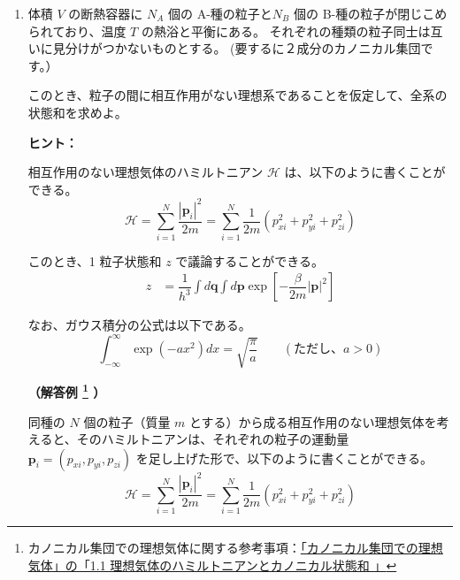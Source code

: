 \documentclass[uplatex,dvipdfmx,a4paper,11pt]{jsarticle}
\begin{document}
\begin{enumerate}
\setlength{\parskip}{0cm} %
\setlength{\itemsep}{0.3cm} %

\item
体積 $V$ の断熱容器に $N_A$ 個の A-種の粒子と$N_B$ 個の B-種の粒子が閉じこめられており、温度 $T$ の熱浴と平衡にある。
それぞれの種類の粒子同士は互いに見分けがつかないものとする。
(要するに２成分のカノニカル集団です。）

このとき、粒子の間に相互作用がない理想系であることを仮定して、全系の状態和を求めよ。

\begin{itembox}[l]{{\bf ヒント：}}

相互作用のない理想気体のハミルトニアン $\mathcal{H}$ は、以下のように書くことができる。
\begin{equation*}
	\mathcal{H} = \sum^N_{i=1}\dfrac{|\bm{p}_i|^2}{2m} = \sum^N_{i=1} \dfrac{1}{2m}(p_{xi}^2 + p_{yi}^2 +p_{zi}^2)
        \label{eq:H_ideal}
\end{equation*}

このとき、1 粒子状態和 $z$ で議論することができる。
\begin{align*}
	z 	&= \dfrac{1}{h^{3}} \int d\bm{q} \int d\bm{p} \exp \left[ -\dfrac{\beta}{2m} |\bm{p}|^2 \right] 
\end{align*}

なお、ガウス積分の公式は以下である。
\begin{equation*}
	\int_{-\infty}^{\infty} \exp(-ax^2)dx = \sqrt{\dfrac{\pi}{a}} \qquad (\text{ただし、$a > 0$}) 
        \label{eq:gauss_sekibunn}
\end{equation*}

\end{itembox}

{\bf （解答例
\footnote{
カノニカル集団での理想気体に関する参考事項：\href{http://kisokouza.island.ac/documents/Cannonical_Ideal_Gas.pdf}{「カノニカル集団での理想気体」の「1.1 理想気体のハミルトニアンとカノニカル状態和
」}
}
）}

同種の $N$ 個の粒子（質量 $m$ とする）から成る相互作用のない理想気体を考えると、そのハミルトニアンは、それぞれの粒子の運動量 $\bm{p}_i = (p_{xi}, p_{yi}, p_{zi}) $ を足し上げた形で、以下のように書くことができる。
\begin{equation*}
	\mathcal{H} = \sum^N_{i=1}\dfrac{|\bm{p}_i|^2}{2m} = \sum^N_{i=1} \dfrac{1}{2m}(p_{xi}^2 + p_{yi}^2 +p_{zi}^2)
        \label{eq:H_ideal}
\end{equation*}


\end{enumerate}
\end{document}
